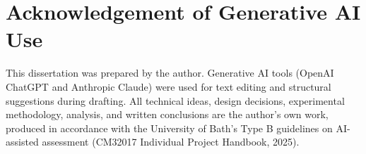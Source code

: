\documentclass[12pt,a4paper]{report}
\begin{document}
\chapter{Acknowledgement of Generative AI Use}
\label{app:ai}

This dissertation was prepared by the author. Generative AI tools (OpenAI ChatGPT and Anthropic Claude) were used for text editing and structural suggestions during drafting. All technical ideas, design decisions, experimental methodology, analysis, and written conclusions are the author's own work, produced in accordance with the University of Bath's Type B guidelines on AI-assisted assessment (CM32017 Individual Project Handbook, 2025).

\end{document}
